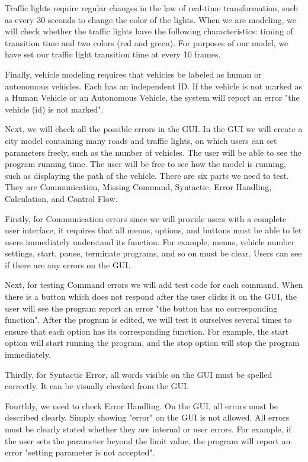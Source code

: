 \documentclass[onecolumn, draftclsnofoot,10pt, compsoc]{IEEEtran}
\begin{document}
Traffic lights require regular changes in the law of real-time transformation, such as every 30 seconds to change the color of the lights.
When we are modeling, we will check whether the traffic lights have the following characteristics: timing of transition time and two colors (red and green).
For purposes of our model, we have set our traffic light transition time at every 10 frames.

Finally, vehicle modeling requires that vehicles be labeled as human or autonomous vehicles.
Each has an independent ID.
If the vehicle is not marked as a Human Vehicle or an Autonomous Vehicle, the system will report an error "the vehicle (id) is not marked".

Next, we will check all the possible errors in the GUI.
In the GUI we will create a city model containing many roads and traffic lights, on which users can set parameters freely, such as the number of vehicles.
The user will be able to see the program running time.
The user will be free to see how the model is running, such as displaying the path of the vehicle.
There are six parts we need to test.
They are Communication, Missing Command, Syntactic, Error Handling, Calculation, and Control Flow.

Firstly, for Communication errors since we will provide users with a complete user interface, it requires that all menus, options, and buttons must be able to let users immediately understand its function.
For example, menus, vehicle number settings, start, pause, terminate programs, and so on must be clear.
Users can see if there are any errors on the GUI.

Next, for testing Command errors we will add test code for each command.
When there is a button which does not respond after the user clicks it on the GUI, the user will see the program report an error "the button has no corresponding function".
After the program is edited, we will test it ourselves several times to ensure that each option has its corresponding function.
For example, the start option will start running the program, and the stop option will stop the program immediately.

Thirdly, for Syntactic Error, all words visible on the GUI must be spelled correctly.
It can be visually checked from the GUI.

Fourthly, we need to check Error Handling.
On the GUI, all errors must be described clearly.
Simply showing "error" on the GUI is not allowed.
All errors must be clearly stated whether they are internal or user errors.
For example, if the user sets the parameter beyond the limit value, the program will report an error "setting parameter is not accepted".
\end{document}
